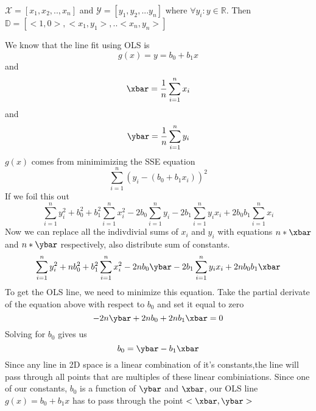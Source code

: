 \documentclass[12pt]{article}
\begin{document}
\begin{enumerate}

$\mathcal{X} = [x_1, x_2,.., x_n]$ and $\mathcal{Y} = [y_1, y_2,...y_n]$ where $\forall{y_i}: y\in\mathbb{R}$. Then $\mathbb{D} =[<1, 0>, <x_1, y_1>, .. <x_n, y_n>]$

We know that the line fit using OLS is \begin{equation} g(x) = y = b_0 + b_1x \end{equation}
and \begin{equation}
\xbar = \frac{1}{n}\sum\limits_{i=1}^n x_i
\end{equation}
and \begin{equation}
\ybar = \frac{1}{n}\sum\limits_{i=1}^n y_i
\end{equation}
$g(x)$ comes from minimimizing the SSE equation \begin{equation}
\sum\limits_{i=1}^n (y_i - (b_0+b_1x_i))^2
\end{equation}
If we foil this out \begin{equation}
\sum\limits_{i=1}^n y_i^2 + b_0^2 +b_1^2\sum\limits_{i=1}^nx_i^2-2b_0\sum\limits_{i=1}^ny_i-2b_1\sum\limits_{i=1}^ny_ix_i+2b_0b_1\sum\limits_{i=1}^nx_i 
\end{equation}
Now we can replace all the indivdivial sums of $x_i$ and $y_i$ with equations $n*\xbar$ and $n*\ybar$ respectively, also distribute sum of constants. \begin{equation}
\sum\limits_{i=1}^ny_i^2+ nb_0^2+ b_1^2\sum\limits_{i=1}^nx_i^2-2nb_0\ybar-2b_1\sum\limits_{i=1}^ny_ix_i+2nb_0b_1\xbar
\end{equation}
To get the OLS line, we need to minimize this equation. Take the partial derivate of the equation above with respect to $b_0$ and set it equal to zero
\begin{equation}
-2n\ybar+2nb_0+2nb_1\xbar = 0
\end{equation}
Solving for $b_0$ gives us \begin{equation}
b_0 = \ybar-b_1\xbar
\end{equation}
Since any line in 2D space is a linear combination of it's constants,the line will pass through all points that are multiples of these linear combiniations. Since one of our constants, $b_0$ is a function of $\ybar$ and $\xbar$, our OLS line $g(x)=b_0+b_1x$ has to pass through the point $<\xbar, \ybar>$


\end{enumerate}
\end{document}
